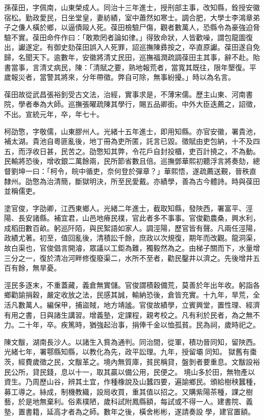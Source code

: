 \begin{pinyinscope}
孫葆田，字佩南，山東榮成人。同治十三年進士，授刑部主事，改知縣，銓授安徽宿松。勤政愛民，日坐堂皇，妻紡績，室中蕭然如寒士。調合肥，大學士李鴻章弟子之傔人橫於鄉，以逼債毆人死。葆田檢驗尸傷，觀者數萬人，恐縣令為豪強迫脅驗不實。葆田命仵作曰：「敢欺罔者論如律。」得致命狀，人皆歡噪，謂包龍圖復出，讞遂定。有御史劾葆田誤入人死罪，詔巡撫陳彞按之，卒直原讞。葆田遂自免歸，名聞天下。逾數年，安徽將清丈民田，巡撫福潤疏調葆田主其事，辭不赴。貽書當事，言清丈病民，陳：「清賦之要，熟地報荒者，當寬其既往，限年墾復。平歲報災者，當警其將來，分年帶徵。弊自可除，無事紛擾。」時以為名言。

葆田故從武昌張裕釗受古文法，治經，實事求是，不薄宋儒。歷主山東、河南書院，學者奉為大師。巡撫張曜疏陳其學行，賜五品卿銜。中外大臣迭薦之，詔徵，不出。宣統元年，卒，年七十。

柯劭憼，字敬儒，山東膠州人。光緒十五年進士，即用知縣。亦官安徽，署貴池，補太湖。貴池自粵匪亂後，地丁冊為吏所匿，託言已毀。徵賦由吏包納，十不及四五，而浮收日甚，民苦之。劭憼知其弊，令花戶自封投櫃，吏百計撓之，不為動。民輸將恐後，增收銀二萬餘兩，民所節省數且倍。巡撫鄧華熙初聽浮言將奏劾，總督劉坤一曰：「柯令，皖中循吏，奈何登於彈章？」華熙悟，遂疏薦送覲，晉秩直隸州。劭憼為治清簡，斷獄明決，所至民愛戴。亦績學，善為古今體詩。時與葆田並稱儒吏。

塗官俊，字劭卿，江西東鄉人。光緒二年進士，截取知縣，發陜西，署富平、涇陽、長安諸縣。補宜君，山邑地瘠民樸，官此者多不事事。官俊勸農桑，興水利，成稻田數百畝。躬巡阡陌，與民絮語如家人。調涇陽，歷官皆有聲。凡兩任涇陽，政績尤著。初至，值回亂後，清積訟千餘，庶政以次規復，期年而改觀。龍洞渠，故白渠也，官俊倡言開濬，眾議以工鉅為難，獨毅然為之。由梯子關而下，水量增三分之一，復於清冶河畔修復廢渠二，水所不至者，勸民鑿井以濟之。先後增井五百有餘，無旱憂。

涇民多逐末，不重蓋藏，義倉無實儲。官俊謂積穀備荒，莫善於年出年收。躬詣各鄉勸諭捐穀，嚴定收放之法，民感其誠，輸納恐後，倉皆充實。十九年，旱荒，全活凡數萬人。編保甲，捕盜賊，地方靖謐。官俊故績學，立賓興堂，置性理、經濟有用之書，日與諸生講習。增義塾，定課程，親考校之。凡有利於民者，為之無不力。二十年，卒。疾篤時，猶強起治事，捐俸千金以恤孤貧。民為祠，歲時祀之。

陳文黻，湖南長沙人。以諸生入貲為通判。同治間，從軍，積功晉同知，留陜西。光緒七年，署鄠縣知縣，以教化為先，政平訟理。九年，授留壩同知。獄舊有棗茨，經費歲徵之民，文黻革之。境內無質庫，貧民稱貸，盤剝者要重息。文黻設裕民公所，貸民錢，息以十一，取其贏以備公用，民便之。境山多於田，無物產以資生。乃周歷山谷，辨其土宜，作種橡說及山蠶四要，遍諭鄉民。頒給樹秧蠶種，募工導之。絲成，制機教織，設局收買，重其值以招之。又購紫陽茶種，課之樹藝，於是地無棄利。俗素樸陋，歲科試附鳳縣額，每試或不得一人。建書院、義塾，置書籍，延高才者為之師。數年之後，橫舍彬彬，遂請奏設學，建官置額。


\end{pinyinscope}
